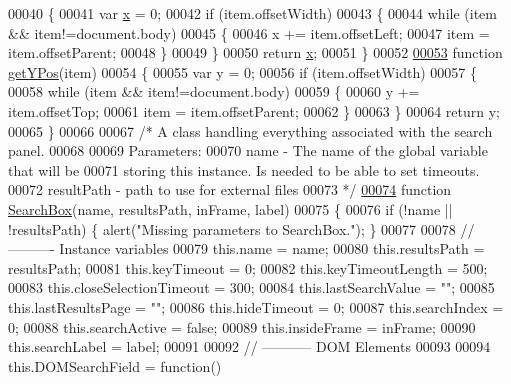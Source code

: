 \begin{DoxyCode}
00040 \{
00041   var \hyperlink{jquery_8js_a4c3eadaa5164016d2c340d495fc6e55e}{x} = 0;
00042   \textcolor{keywordflow}{if} (item.offsetWidth)
00043   \{
00044     \textcolor{keywordflow}{while} (item && item!=document.body)
00045     \{
00046       x   += item.offsetLeft;
00047       item = item.offsetParent;
00048     \}
00049   \}
00050   \textcolor{keywordflow}{return} \hyperlink{jquery_8js_a4c3eadaa5164016d2c340d495fc6e55e}{x};
00051 \}
00052 
\hypertarget{search_8js_source_l00053}{}\hyperlink{search_8js_a8d7b405228661d7b6216b6925d2b8a69}{00053} \textcolor{keyword}{function} \hyperlink{search_8js_a8d7b405228661d7b6216b6925d2b8a69}{getYPos}(item)
00054 \{
00055   var y = 0;
00056   \textcolor{keywordflow}{if} (item.offsetWidth)
00057   \{
00058      \textcolor{keywordflow}{while} (item && item!=document.body)
00059      \{
00060        y   += item.offsetTop;
00061        item = item.offsetParent;
00062      \}
00063   \}
00064   \textcolor{keywordflow}{return} y;
00065 \}
00066 
00067 \textcolor{comment}{/* A class handling everything associated with the search panel.}
00068 \textcolor{comment}{}
00069 \textcolor{comment}{   Parameters:}
00070 \textcolor{comment}{   name - The name of the global variable that will be }
00071 \textcolor{comment}{          storing this instance.  Is needed to be able to set timeouts.}
00072 \textcolor{comment}{   resultPath - path to use for external files}
00073 \textcolor{comment}{*/}
\hypertarget{search_8js_source_l00074}{}\hyperlink{search_8js_a52066106482f8136aa9e0ec859e8188f}{00074} \textcolor{keyword}{function} \hyperlink{search_8js_a52066106482f8136aa9e0ec859e8188f}{SearchBox}(name, resultsPath, inFrame, label)
00075 \{
00076   \textcolor{keywordflow}{if} (!name || !resultsPath) \{  alert(\textcolor{stringliteral}{"Missing parameters to SearchBox."}); \}
00077    
00078   \textcolor{comment}{// ---------- Instance variables}
00079   this.name                  = name;
00080   this.resultsPath           = resultsPath;
00081   this.keyTimeout            = 0;
00082   this.keyTimeoutLength      = 500;
00083   this.closeSelectionTimeout = 300;
00084   this.lastSearchValue       = \textcolor{stringliteral}{""};
00085   this.lastResultsPage       = \textcolor{stringliteral}{""};
00086   this.hideTimeout           = 0;
00087   this.searchIndex           = 0;
00088   this.searchActive          = \textcolor{keyword}{false};
00089   this.insideFrame           = inFrame;
00090   this.searchLabel           = label;
00091 
00092   \textcolor{comment}{// ----------- DOM Elements}
00093 
00094   this.DOMSearchField = \textcolor{keyword}{function}()

\end{DoxyCode}
